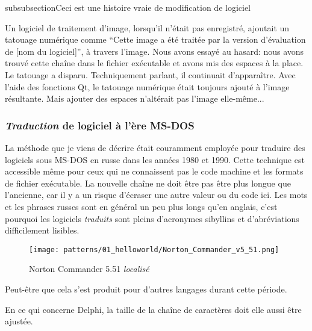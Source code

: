 subsubsection{Ceci est une histoire vraie de modification de logiciel}
\myindex{\SoftwareCracking}

Un logiciel de traitement d'image, lorsqu'il n'était pas enregistré, ajoutait un
tatouage numérique comme ``Cette image a été traitée par la version d'évaluation
de [nom du logiciel]'', à travers l'image.
Nous avons essayé au hasard: nous avons trouvé cette chaîne dans le fichier exécutable
et avons mis des espaces à la place.
Le tatouage a disparu.
Techniquement parlant, il continuait d'apparaître.
Avec l'aide des fonctions Qt, le tatouage numérique était toujours ajouté à l'image
résultante.
Mais ajouter des espaces n'altérait pas l'image elle-même...

\subsubsection{\emph{Traduction} de logiciel à l'ère MS-DOS}

La méthode que je viens de décrire était couramment employée pour traduire des logiciels sous MS-DOS en russe dans les
années 1980 et 1990.
Cette technique est accessible même pour ceux qui ne connaissent pas le code machine
et les formats de fichier exécutable.
La nouvelle chaîne ne doit être pas être plus longue que l'ancienne, car il y a un
risque d'écraser une autre valeur ou du code ici.
Les mots et les phrases russes sont en général un peu plus longs qu'en anglais, c'est pourquoi les logiciels
\emph{traduits} sont pleins d'acronymes sibyllins et d'abréviations difficilement lisibles.

\begin{figure}[H]
\centering
\texttt{[image: patterns/01\_helloworld/Norton\_Commander\_v5\_51.png]}
\caption{Norton Commander 5.51 \emph{localisé}}
\end{figure}

Peut-être que cela s'est produit pour d'autres langages durant cette période.

En ce qui concerne Delphi, la taille de la chaîne de caractères doit elle aussi être ajustée.
